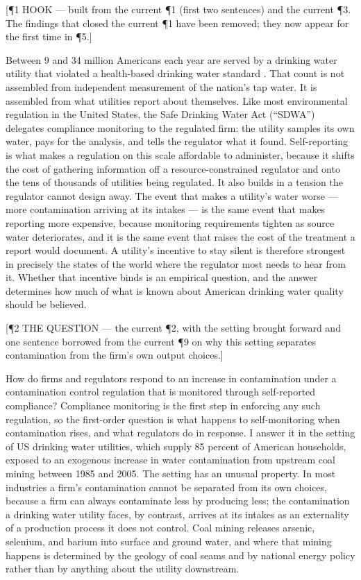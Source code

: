 \documentclass[12pt]{article}
\newcommand{\annot}[1]{%
  \par\nobreak\vspace{0.35em}%
  {\footnotesize\sffamily\color{annotcol}\raggedright #1\par}%
  \nobreak\vspace{-0.35em}\nobreak}
\begin{document}
\annot{[\P1 \textbullet{} HOOK --- built from the current \P1 (first two sentences) and
the current \P3. The findings that closed the current \P1 have been removed; they now
appear for the first time in \P5.]}
Between 9 and 34 million Americans each year are served by a drinking water utility that
violated a health-based drinking water standard \parencite{allaire2018national}. That
count is not assembled from independent measurement of the nation's tap water. It is
assembled from what utilities report about themselves. Like most environmental
regulation in the United States, the Safe Drinking Water Act (``SDWA'') delegates
compliance monitoring to the regulated firm: the utility samples its own water, pays for
the analysis, and tells the regulator what it found. Self-reporting is what makes a
regulation on this scale affordable to administer, because it shifts the cost of
gathering information off a resource-constrained regulator and onto the tens of
thousands of utilities being regulated. It also builds in a tension the regulator cannot
design away. The event that makes a utility's water worse --- more contamination
arriving at its intakes --- is the same event that makes reporting more expensive,
because monitoring requirements tighten as source water deteriorates, and it is the same
event that raises the cost of the treatment a report would document. A utility's
incentive to stay silent is therefore strongest in precisely the states of the world
where the regulator most needs to hear from it. Whether that incentive binds is an
empirical question, and the answer determines how much of what is known about American
drinking water quality should be believed.

\annot{[\P2 \textbullet{} THE QUESTION --- the current \P2, with the setting brought
forward and one sentence borrowed from the current \P9 on why this setting separates
contamination from the firm's own output choices.]}
How do firms and regulators respond to an increase in contamination under a
contamination control regulation that is monitored through self-reported compliance?
Compliance monitoring is the first step in enforcing any such regulation, so the
first-order question is what happens to self-monitoring when contamination rises, and
what regulators do in response. I answer it in the setting of US drinking water
utilities, which supply 85 percent of American households, exposed to an exogenous
increase in water contamination from upstream coal mining between 1985 and 2005. The
setting has an unusual property. In most industries a firm's contamination cannot be
separated from its own choices, because a firm can always contaminate less by producing
less; the contamination a drinking water utility faces, by contrast, arrives at its
intakes as an externality of a production process it does not control. Coal mining
releases arsenic, selenium, and barium into surface and ground water, and where that
mining happens is determined by the geology of coal seams and by national energy policy
rather than by anything about the utility downstream.
\end{document}
